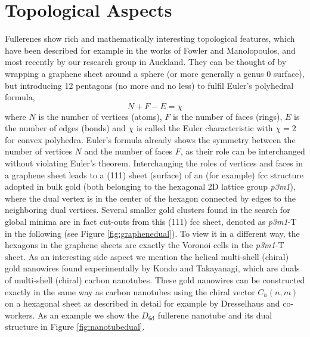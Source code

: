 \section{\label{sec:TopAsp}Topological Aspects}

Fullerenes show rich and mathematically interesting topological
features\autocite{Cataldo-Ori-2011,Schwerdtfeger_topologyfullerenes_2015},
which have been described for example in the works of Fowler and
Manolopoulos\autocite{Fowler-atlas-2006}, and most recently by our research
group in Auckland.\autocite{Schwerdtfeger_topologyfullerenes_2015} They can be
thought of by wrapping a graphene sheet around a sphere (or more generally a
genus 0 surface), but introducing 12 pentagons (no more and no less) to fulfil
Euler's polyhedral formula, 
%
\begin{equation}
  \label{eq:euler} 
  N + F -E = \chi 
\end{equation}
%
where $N$ is the number of vertices (atoms), $F$ is the number of faces
(rings), $E$ is the number of edges (bonds) and $\chi$ is called the Euler
characteristic with $\chi=2$ for convex
polyhedra.\autocite{Kotschick_TopologyCombinatoricsSoccer_2006} Euler's formula
already shows the symmetry between the number of vertices $N$ and the number of
faces $F$, as their role can be interchanged without violating Euler's theorem.
Interchanging the roles of vertices and faces in a graphene sheet leads to a
(111) sheet (surface) of an (for example) fcc structure adopted in bulk gold
(both belonging to the hexagonal 2D lattice group \textit{p3m1}), where the
dual vertex is in the center of the hexagon connected by edges to the
neighboring dual vertices. Several smaller gold clusters found in the search
for global minima are in fact cut-outs from this (111) fcc
sheet,\autocite{Assadollahzadeh_systematicsearchminimum_2009} denoted as
\textit{p3m1}-T in the following (see Figure \ref{fig:graphenedual}). To view
it in a different way, the hexagons in the graphene sheets are exactly the
Voronoi cells in the \textit{p3m1}-T sheet. As an interesting side aspect we
mention the helical multi-shell (chiral) gold nanowires found experimentally by
Kondo and Takayanagi,\autocite{Kondo-2000} which are duals of multi-shell
(chiral) carbon nanotubes.\autocite{Johansson_Au3224CaratGolden_2004} These
gold nanowires can be constructed exactly in the same way as carbon nanotubes
using the chiral vector $C_h(n,m)$ on a hexagonal sheet as described in detail
for example by Dresselhaus and co-workers.\autocite{Dresselhaus-1992} As an
example we show the $D_\mathrm{6d}$ fullerene nanotube and its dual structure in
Figure \ref{fig:nanotubedual}.

